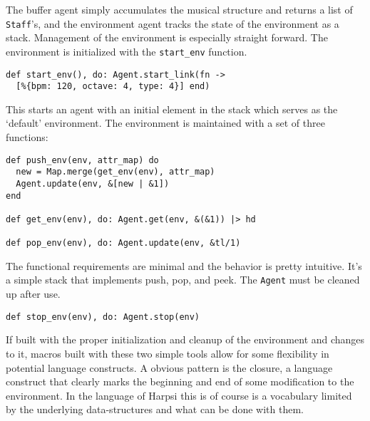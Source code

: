 \documentclass[11pt]{article}
\begin{document}
The buffer agent simply accumulates the musical structure and
returns a list of \texttt{Staff}'s, and the environment agent tracks the
state of the environment as a stack. Management of the environment
is especially straight forward. The environment is initialized with
the \texttt{start\_env} function.
\begin{verbatim}
def start_env(), do: Agent.start_link(fn ->
  [%{bpm: 120, octave: 4, type: 4}] end)
\end{verbatim}
This starts an agent with an initial element in the stack which
serves as the `default' environment. The environment is maintained
with a set of three functions:
\begin{verbatim}
def push_env(env, attr_map) do
  new = Map.merge(get_env(env), attr_map)
  Agent.update(env, &[new | &1])
end

def get_env(env), do: Agent.get(env, &(&1)) |> hd

def pop_env(env), do: Agent.update(env, &tl/1)
\end{verbatim}
The functional requirements are minimal and the behavior
is pretty intuitive. It's a simple stack that implements push, pop,
and peek. The \texttt{Agent} must be cleaned up after use.
\begin{verbatim}
def stop_env(env), do: Agent.stop(env)
\end{verbatim}

If built with the proper initialization and cleanup of the
environment and changes to it, macros built with these two simple
tools allow for some flexibility in potential language
constructs. A obvious pattern is the closure, a language construct
that clearly marks the beginning and end of some modification to
the environment. In the language of Harpsi this is of course is a
vocabulary limited by the underlying data-structures and what can
be done with them.
\end{document}
